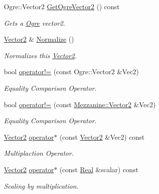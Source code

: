 \begin{DoxyCompactItemize}
Ogre::Vector2 \hyperlink{classMezzanine_1_1Vector2_a7d98428699beefd90861cd44ab125083}{GetOgreVector2} () const 
\begin{DoxyCompactList}\small\item\em Gets a \hyperlink{namespaceOgre}{Ogre} vector2. \item\end{DoxyCompactList}\item 
\hyperlink{classMezzanine_1_1Vector2}{Vector2} \& \hyperlink{classMezzanine_1_1Vector2_a145a69136ee65d32512dbb47faa3b0df}{Normalize} ()
\begin{DoxyCompactList}\small\item\em Normalizes this \hyperlink{classMezzanine_1_1Vector2}{Vector2}. \item\end{DoxyCompactList}\item 
bool \hyperlink{classMezzanine_1_1Vector2_a0f8d828c2bcce1bd568fe11b44d83901}{operator!=} (const Ogre::Vector2 \&Vec2)
\begin{DoxyCompactList}\small\item\em Equality Comparison Operator. \item\end{DoxyCompactList}\item 
bool \hyperlink{classMezzanine_1_1Vector2_ae777558f9f198bf3523e6fabb22e7b3f}{operator!=} (const \hyperlink{classMezzanine_1_1Vector2}{Mezzanine::Vector2} \&Vec2)
\begin{DoxyCompactList}\small\item\em Equality Comparison Operator. \item\end{DoxyCompactList}\item 
\hyperlink{classMezzanine_1_1Vector2}{Vector2} \hyperlink{classMezzanine_1_1Vector2_aee38ccddf8fac68406b2b5ea479a8332}{operator$\ast$} (const \hyperlink{classMezzanine_1_1Vector2}{Vector2} \&Vec2) const 
\begin{DoxyCompactList}\small\item\em Multiplaction Operator. \item\end{DoxyCompactList}\item 
\hyperlink{classMezzanine_1_1Vector2}{Vector2} \hyperlink{classMezzanine_1_1Vector2_a310d2690ca671c81dc58c571479ee004}{operator$\ast$} (const \hyperlink{namespaceMezzanine_a726731b1a7df72bf3583e4a97282c6f6}{Real} \&scalar) const 
\begin{DoxyCompactList}\small\item\em Scaling by multiplication. \item\end{DoxyCompactList}\item 

\end{DoxyCompactItemize}
